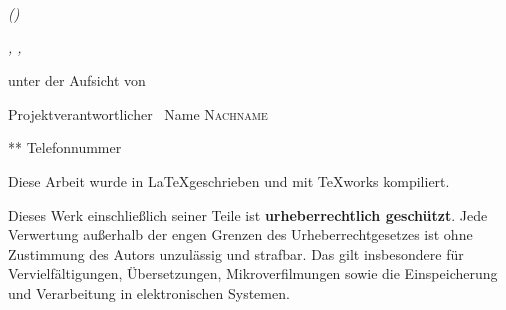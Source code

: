 \begin{titlepage}	
\centering	
{\scshape\LARGE \auditCommittee \par}
\vspace{1cm}
{\scshape\Large \mainTitle \par}
\vspace{1.5cm}
{\huge\bfseries \projectTitleLong \par}
\vspace{1cm}
{\Large\itshape \authorName \par}
\vspace{1cm}
{\Large\bfseries \apprenticeship \par}
\vspace{1cm}
{\Large\itshape \companyNameLong (\companyNameShort) \par}
\vspace{1cm}
{\large\itshape \companyLocationStreet \companyLocationNumber, \companyLocationPostcode \companyLocationCity, \companyLocationState \par}

\vfill
unter der Aufsicht von \par
Projektverantwortlicher ~Name \textsc{Nachname} \par
**  Telefonnummer
\vfill		
{\large \dateOfCreation \par}
\vspace{1cm}
\small 
Diese Arbeit wurde in \LaTeX  geschrieben und mit TeXworks kompiliert. \\ %
\small
\noindent
\begin{justify}
	Dieses Werk einschließlich seiner Teile ist \textbf{urheberrechtlich geschützt}.
	Jede Verwertung außerhalb der engen Grenzen des Urheberrechtgesetzes ist ohne
	Zustimmung des Autors unzulässig und strafbar. Das gilt insbesondere für
	Vervielfältigungen, Übersetzungen, Mikroverfilmungen sowie die Einspeicherung
	und Verarbeitung in elektronischen Systemen.
\end{justify}

\end{titlepage}